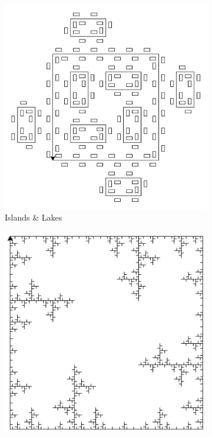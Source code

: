 \documentclass[12pt,twoside]{reedthesis}
\begin{document}
	\begin{figure}[h]
	\begin{subfigure}{0.5\textwidth}
		\centering
		\includegraphics[height = 0.9\textwidth]{Images/TurtleGraphics4}
		\caption{Islands \& Lakes\footnotemark}
		\label {TurtleGraphics4}
	\end{subfigure}%
	\begin{subfigure}{0.5\textwidth}
		\centering
		\includegraphics[height = 0.9\textwidth]{Images/TurtleGraphics5}

\end{subfigure}
\end{figure}
\end{document}
